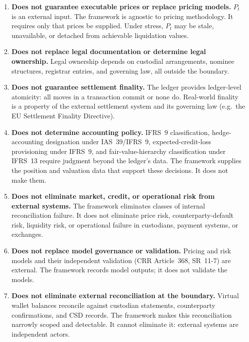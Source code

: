 \begin{enumerate}
\item \textbf{Does not guarantee executable prices or replace pricing models.} $P_t$ is an external input. The framework is agnostic to pricing methodology. It requires only that prices be supplied. Under stress, $P_t$ may be stale, unavailable, or detached from achievable liquidation values.

\item \textbf{Does not replace legal documentation or determine legal ownership.} Legal ownership depends on custodial arrangements, nominee structures, registrar entries, and governing law, all outside the boundary.

\item \textbf{Does not guarantee settlement finality.} The ledger provides ledger-level atomicity: all moves in a transaction commit or none do. Real-world finality is a property of the external settlement system and its governing law (e.g.\ the EU Settlement Finality Directive).

\item \textbf{Does not determine accounting policy.} IFRS~9 classification, hedge-accounting designation under IAS~39/IFRS~9, expected-credit-loss provisioning under IFRS~9, and fair-value-hierarchy classification under IFRS~13 require judgment beyond the ledger's data. The framework supplies the position and valuation data that support these decisions. It does not make them.

\item \textbf{Does not eliminate market, credit, or operational risk from external systems.} The framework eliminates classes of internal reconciliation failure. It does not eliminate price risk, counterparty-default risk, liquidity risk, or operational failure in custodians, payment systems, or exchanges.

\item \textbf{Does not replace model governance or validation.} Pricing and risk models and their independent validation (CRR Article~368, SR~11-7) are external. The framework records model outputs; it does not validate the models.

\item \textbf{Does not eliminate external reconciliation at the boundary.} Virtual wallet balances reconcile against custodian statements, counterparty confirmations, and CSD records. The framework makes this reconciliation narrowly scoped and detectable. It cannot eliminate it: external systems are independent actors.


\end{enumerate}

